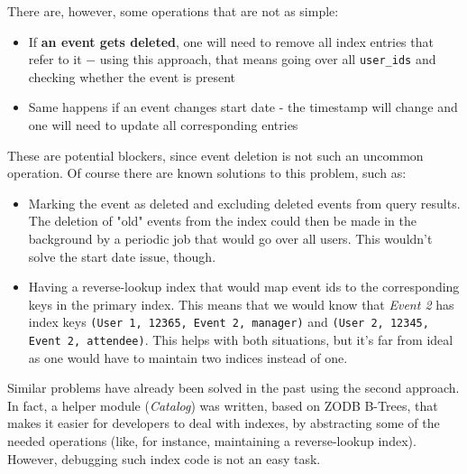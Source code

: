 There are, however, some operations that are not as simple:

\begin{itemize}
  \item If \textbf{an event gets deleted}, one will need to remove all index entries that refer to it $-$ using this approach, that means going over all \texttt{user\_ids} and checking whether the event is present
  \item Same happens if an event changes start date - the timestamp will change and one will need to update all corresponding entries
\end{itemize}

These are potential blockers, since event deletion is not such an uncommon operation. Of course there are known solutions to this problem, such as:

\begin{itemize}
  \item Marking the event as deleted and excluding deleted events from query results. The deletion of "old" events from the index could then be made in the background by a periodic job that would go over all users. This wouldn't solve the start date issue, though.
  \item Having a reverse-lookup index that would map event ids to the corresponding keys in the primary index. This means that we would know that \textit{Event 2} has index keys \texttt{(User 1, 12365, Event 2, manager)} and \texttt{(User 2, 12345, Event 2, attendee)}. This helps with both situations, but it's far from ideal as one would have to maintain two indices instead of one.
\end{itemize}

Similar problems have already been solved in the past using the second approach. In fact, a helper module (\textit{Catalog}) was written, based on \textsc{ZODB} B-Trees, that makes it easier for developers to deal with indexes, by abstracting some of the needed operations (like, for instance, maintaining a reverse-lookup index). However, debugging such index code is not an easy task.

